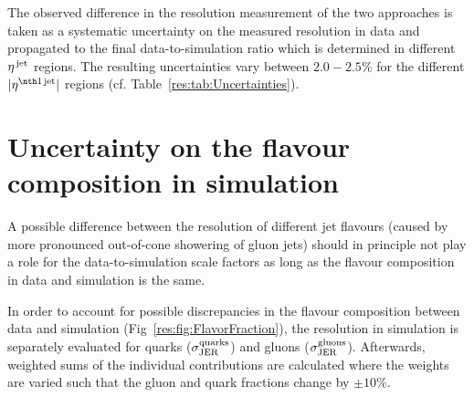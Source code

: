 The observed difference in the resolution measurement of the two approaches is taken as a systematic uncertainty on the measured resolution in data and propagated to the final data-to-simulation ratio which is determined in different ${\eta}^{\text{\,jet}}$ regions.
The resulting uncertainties vary between $2.0-2.5\%$ for the different $|\etafirstjet|$ regions (cf. Table~\ref{res:tab:Uncertainties}).

\section*{Uncertainty on the flavour composition in simulation}
A possible difference between the resolution of different jet flavours (\eg caused by more pronounced out-of-cone showering of gluon jets) should in principle not play a role for the data-to-simulation scale factors \rhores as long as the flavour composition in data and simulation is the same.

In order to account for possible discrepancies in the flavour composition between data and simulation (Fig~\ref{res:fig:FlavorFraction}), the resolution in simulation is separately evaluated for quarks ($\sigma_\mathrm{JER}^\text{quarks}$) and gluons ($\sigma_\mathrm{JER}^\text{gluons}$).
Afterwards, weighted sums of the individual contributions are calculated where the weights are varied such that the gluon and quark fractions change by $\pm 10\%$.

